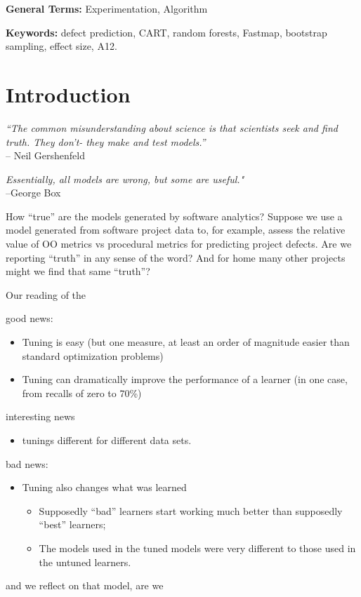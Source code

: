 \documentclass{sig-alternative}
\newcommand{\bi}{\begin{itemize}[leftmargin=0.4cm]}
\newcommand{\ei}{\end{itemize}}
\begin{document}
\vspace{1mm}
\noindent
{\bf General Terms:} Experimentation, Algorithm

\vspace{1mm}
\noindent
{\bf Keywords:} defect prediction, CART, random forests,
Fastmap,   bootstrap sampling, effect size, A12.

\section{Introduction}

\begin{raggedleft}
{\em ``The  common misunderstanding about science 
is that scientists seek and find truth. They don't- 
they make and test models.''}\\ -- Neil Gershenfeld

{\em Essentially, all models are wrong, but some are useful."}\\ --George Box

\end{raggedleft}

How ``true'' are the  models generated by software analytics?
Suppose we use a model generated from software project data to, for example,
assess the relative value of OO metrics vs procedural metrics for predicting
project defects. Are we reporting ``truth'' in any sense of the word? And for home
many other projects might we find that same ``truth''?

Our reading of the 

good news:
\bi 
\item Tuning is easy (but one measure, at least an order of magnitude easier than 
standard optimization problems)
\item Tuning can dramatically improve the performance of a learner (in one case, from recalls
of zero to 70\%)
\ei
interesting news
\bi 
\item tunings different for different data sets.
\ei 
bad news:
\bi
\item Tuning also changes what was learned
\bi
\item Supposedly ``bad'' learners start working much better than supposedly ``best'' learners;
\item The models used in the tuned models were very different to those used in the untuned learners.
\ei 
\ei 
and we reflect on that model, are we 
\end{document}
